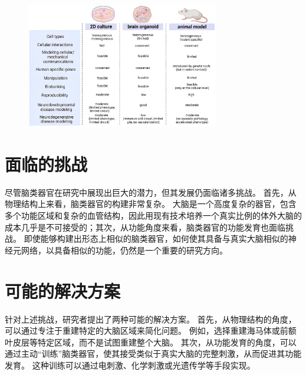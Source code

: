\begin{figure}[!htbp]
    \centering
    \includegraphics[width=0.75\textwidth]{Img/comparisons.png}
    \label{fig:comparisons}
\end{figure}

\section{面临的挑战}\label{sec:research-challenges}
尽管脑类器官在研究中展现出巨大的潜力，但其发展仍面临诸多挑战。
首先，从物理结构上来看，脑类器官的构建非常复杂。
大脑是一个高度复杂的器官，包含多个功能区域和复杂的血管结构，因此用现有技术培养一个真实比例的体外大脑的成本几乎是不可接受的；其次，从功能角度来看，脑类器官的功能发育也面临挑战。
即使能够构建出形态上相似的脑类器官，如何使其具备与真实大脑相似的神经元网络，以具备相似的功能，仍然是一个重要的研究方向。


\section{可能的解决方案}\label{sec:research-solutions}
针对上述挑战，研究者提出了两种可能的解决方案。
首先，从物理结构的角度，可以通过专注于重建特定的大脑区域来简化问题。
例如，选择重建海马体或前额叶皮层等特定区域，而不是试图重建整个大脑。
其次，从功能发育的角度，可以通过主动“训练”脑类器官，使其接受类似于真实大脑的完整刺激，从而促进其功能发育。
这种训练可以通过电刺激、化学刺激或光遗传学等手段实现。
